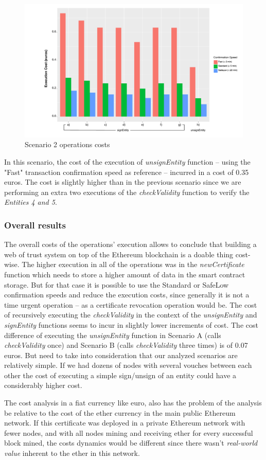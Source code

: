 \begin{figure}[htb]
  \centering
  \includegraphics[scale=0.5]{Figures/evaluation/wot-scenario2.pdf}
  \caption{Scenario 2 operations costs}
\label{fig:scenario2-operation-cost}
\end{figure}

In this scenario, the cost of the execution of \textit{unsignEntity} function – using the "Fast" transaction confirmation speed as reference – incurred in a cost of 0.35 euros.
The cost is slightly higher than in the previous scenario since we are performing an extra two executions of the \textit{checkValidity} function to verify the \textit{Entities 4 and 5}.

\subsubsection{Overall results}

The overall costs of the operations' execution allows to conclude that building a web of trust system on top of the Ethereum blockchain is a doable thing cost-wise.
The higher execution in all of the operations was in the \textit{newCertificate} function which needs to store a higher amount of data in the smart contract storage. But for that case it is possible to use the Standard or SafeLow confirmation speeds and reduce the execution costs, since generally it is not a time urgent operation – as a certificate revocation operation would be.
The cost of recursively executing the \textit{checkValidity} in the context of the \textit{unsignEntity} and \textit{signEntity} functions seems to incur in slightly lower increments of cost. The cost difference of executing the \textit{unsignEntity} function in Scenario A (calls \textit{checkValidity} once) and Scenario B (calls \textit{checkValidity} three times) is of 0.07 euros. But need to take into consideration that our analyzed scenarios are relatively simple. If we had dozens of nodes with several vouches between each other the cost of executing a simple sign/unsign of an entity could have a considerably higher cost.

The cost analysis in a fiat currency like euro, also has the problem of the analysis be relative to the cost of the ether currency in the main public Ethereum network.
If this certificate was deployed in a private Ethereum network with fewer nodes, and with all nodes mining and receiving ether for every successful block mined, the costs dynamics would be different since there wasn't \textit{real-world value} inherent to the ether in this network.
